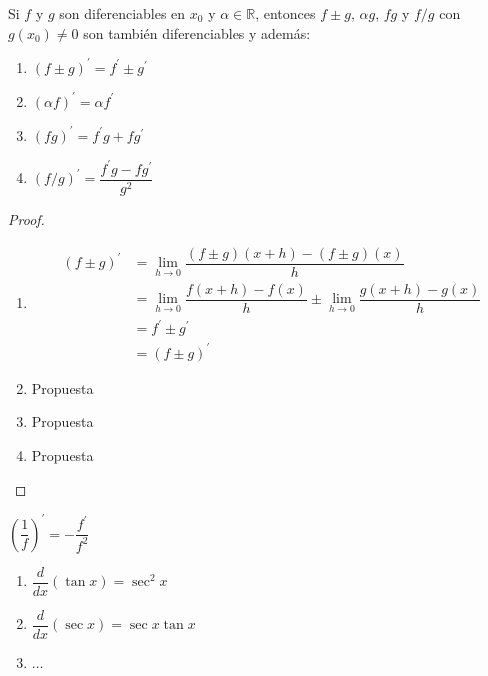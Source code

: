 \begin{thm}
    Si $f$ y $g$ son diferenciables en $x_0$ y $\alpha \in \mathbb{R}$, entonces $f \pm g$, $\alpha g$, $fg$ y $f/g$ con $g(x_0) \neq 0$ son también diferenciables y además:

    \begin{enumerate}
        \item $(f \pm g)^\prime = f^\prime \pm g^\prime$
        \item $(\alpha f)^\prime = \alpha f^\prime$
        \item $(fg)^\prime = f^\prime g + fg^\prime$
        \item $(f/g)^\prime = \dfrac{f^\prime g - fg^\prime}{g^2}$
    \end{enumerate}
\end{thm}

\begin{proof}
    \begin{enumerate}
        \item 
        \begin{align*}
            (f \pm g)^\prime & = \lim_{h \to 0} \dfrac{(f \pm g)(x+h)-(f \pm g)(x)}{h} \\
            & = \lim_{h \to 0} \dfrac{f(x+h)-f(x)}{h} \pm \lim_{h \to 0} \dfrac{g(x+h)-g(x)}{h} \\
            & = f^\prime \pm g^\prime \\
            & = (f \pm g)^\prime 
        \end{align*}
        \item Propuesta
        \item Propuesta
        \item Propuesta
    \end{enumerate}
\end{proof}

\newpage

\begin{cor}
    $\left(\dfrac{1}{f}\right)^\prime = -\dfrac{f^\prime}{f^2}$
\end{cor}

\begin{exs}\leavevmode
    \begin{enumerate}
        \item $\dfrac{d}{dx}(\tan{x}) = \sec^2{x}$
        \item $\dfrac{d}{dx}(\sec{x}) = \sec{x}\tan{x}$
        \item $\dots$
    \end{enumerate}
\end{exs}

